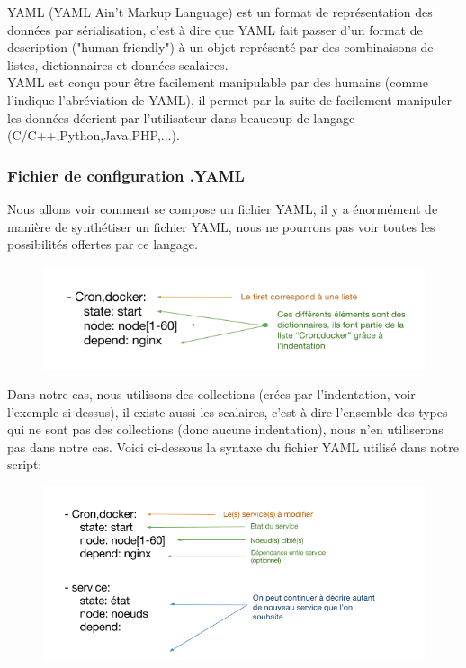 \documentclass[a4paper,11pt]{article}
\begin{document}
YAML (YAML Ain't Markup Language) est un format de représentation des données par sérialisation, c'est à dire que YAML fait passer d'un format de description ("human friendly") à un objet représenté par des combinaisons de listes, dictionnaires et données scalaires. 
\\
YAML est conçu pour être facilement manipulable par des humains (comme l'indique l'abréviation de YAML), il permet par la suite de facilement manipuler les données décrient par l'utilisateur dans beaucoup de langage (C/C++,Python,Java,PHP,...).

\subsubsection{Fichier de configuration .YAML}
\label{subsub:4.2.2}
Nous allons voir comment se compose un fichier YAML, il y a énormément de manière de synthétiser un fichier YAML, nous ne pourrons pas voir toutes les possibilités offertes par ce langage.
\smallbreak
\begin{figure}[hbtp]
\centering
\includegraphics[scale=0.7]{syntaxe_yaml.png}
\end{figure}
Dans notre cas, nous utilisons des collections (crées par l'indentation, voir l'exemple si dessus), il existe aussi les scalaires, c'est à dire l'ensemble des types qui ne sont pas des collections (donc aucune indentation), nous n'en utiliserons pas dans notre cas.
\smallbreak
Voici ci-dessous la syntaxe du fichier YAML utilisé dans notre script:
\smallbreak
\begin{figure}[hbtp]
\centering
\includegraphics[scale=0.7]{syntaxe_yaml2.png}
\end{figure}
\pagebreak
 
\end{document}
